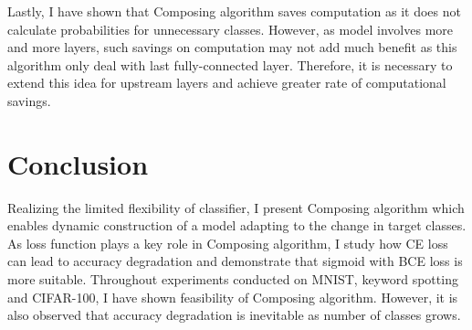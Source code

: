 \documentclass{article}
\begin{document}
Lastly, I have shown that Composing algorithm saves computation as it does not calculate probabilities for unnecessary classes. However, as model involves more and more layers, such savings on computation may not add much benefit as this algorithm only deal with last fully-connected layer. Therefore, it is necessary to extend this idea for upstream layers and achieve greater rate of computational savings.

\section{Conclusion}

Realizing the limited flexibility of classifier, I present Composing algorithm which enables dynamic construction of a model adapting to the change in target classes. As loss function plays a key role in Composing algorithm, I study how CE loss can lead to accuracy degradation and demonstrate that sigmoid with BCE loss is more suitable. Throughout experiments conducted on MNIST, keyword spotting and CIFAR-100, I have shown feasibility of Composing algorithm. However, it is also observed that accuracy degradation is inevitable as number of classes grows.

\newpage

\nocite{*}



\end{document}
